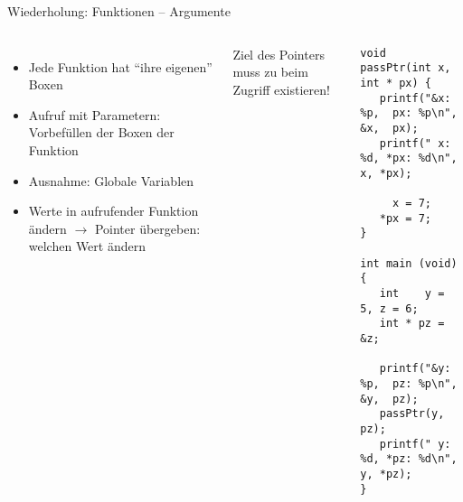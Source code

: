 \begin{frame}[fragile]{Wiederholung: Funktionen -- Argumente}
%
\begin{columns}[T]
\begin{itemize}
\item Jede Funktion hat \enquote{ihre eigenen} Boxen
\item Aufruf mit Parametern: Vorbefüllen der Boxen der Funktion
\item Ausnahme: Globale Variablen
\item Werte in aufrufender Funktion ändern \newline
	$\rightarrow$ Pointer übergeben: welchen Wert ändern
\end{itemize}
%
\begin{warnbox}
Ziel des Pointers muss zu beim Zugriff existieren!
\end{warnbox}
%
\begin{codebox}
\begin{verbatim}
void passPtr(int x, int * px) {
   printf("&x: %p,  px: %p\n", &x,  px);
   printf(" x: %d, *px: %d\n",  x, *px);
   
     x = 7;
   *px = 7;
}

int main (void) {
   int    y = 5, z = 6;
   int * pz = &z;
   
   printf("&y: %p,  pz: %p\n", &y,  pz);
   passPtr(y, pz);
   printf(" y: %d, *pz: %d\n",  y, *pz);
}
\end{verbatim}
\end{codebox}
\end{columns}

%
\end{frame}


